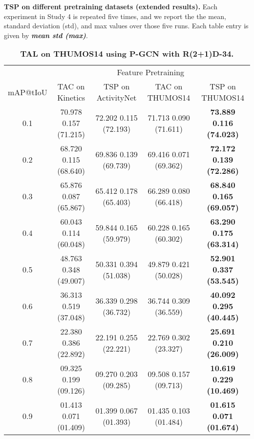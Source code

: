 \documentclass[10pt,twocolumn,letterpaper]{article}
\begin{document}
    
     \begin{table*}[t]
    \small
    \centering
    \caption{\textbf{TSP on different pretraining datasets (extended results).} Each experiment in Study 4 is repeated five times, and we report the the mean, standard deviation (std), and max values over those five runs. Each table entry is given by \textit{\textbf{mean  std (max)}}.}
    \label{table:supp_mat_extended_ablation_study_4}

\begin{subtable}{\linewidth}
    \centering
    \vspace{-5pt}
    \caption{\bf TAL on THUMOS14 using P-GCN with R(2+1)D-34.}
    \vspace{-5pt}
    \begin{tabular}{c|cc|cc}
    \toprule 
            & \multicolumn{4}{c}{Feature Pretraining} \\ 
    mAP@tIoU& TAC on Kinetics                           & TSP on ActivityNet                        & TAC on THUMOS14                           & TSP on THUMOS14 \\ \midrule
    0.1     & 70.978 {\scriptsize  0.157} (71.215) & 72.202 {\scriptsize  0.115} (72.193) & 71.713 {\scriptsize  0.090} (71.611) &\bf 73.889 {\scriptsize  0.116} (74.023) \\
    0.2     & 68.720 {\scriptsize  0.115} (68.640) & 69.836 {\scriptsize  0.139} (69.739) & 69.416 {\scriptsize  0.071} (69.362) &\bf 72.172 {\scriptsize  0.139} (72.286) \\
    0.3     & 65.876 {\scriptsize  0.087} (65.867) & 65.412 {\scriptsize  0.178} (65.403) & 66.289 {\scriptsize  0.080} (66.418) &\bf 68.840 {\scriptsize  0.165} (69.057) \\
    0.4     & 60.043 {\scriptsize  0.114} (60.048) & 59.844 {\scriptsize  0.165} (59.979) & 60.228 {\scriptsize  0.165} (60.302) &\bf 63.290 {\scriptsize  0.175} (63.314) \\
\rowcolor{Gray}
    0.5     & 48.763 {\scriptsize  0.348} (49.007) & 50.331 {\scriptsize  0.394} (51.038) & 49.879 {\scriptsize  0.421} (50.028) &\bf 52.901 {\scriptsize  0.337} (53.545) \\
    0.6     & 36.313 {\scriptsize  0.519} (37.048) & 36.339 {\scriptsize  0.298} (36.732) & 36.744 {\scriptsize  0.309} (36.559) &\bf 40.092 {\scriptsize  0.295} (40.445) \\
    0.7     & 22.380 {\scriptsize  0.386} (22.892) & 22.191 {\scriptsize  0.255} (22.221) & 22.769 {\scriptsize  0.302} (23.327) &\bf 25.691 {\scriptsize  0.210} (26.009) \\
    0.8     & 09.325 {\scriptsize  0.199} (09.126) & 09.270 {\scriptsize  0.203} (09.285) & 09.508 {\scriptsize  0.157} (09.713) &\bf 10.619 {\scriptsize  0.229} (10.469) \\
    0.9     & 01.413 {\scriptsize  0.071} (01.409) & 01.399 {\scriptsize  0.067} (01.393) & 01.435 {\scriptsize  0.103} (01.484) &\bf 01.615 {\scriptsize  0.071} (01.674) \\
    \bottomrule
    \end{tabular}
\end{subtable}


\end{table*}
\end{document}
